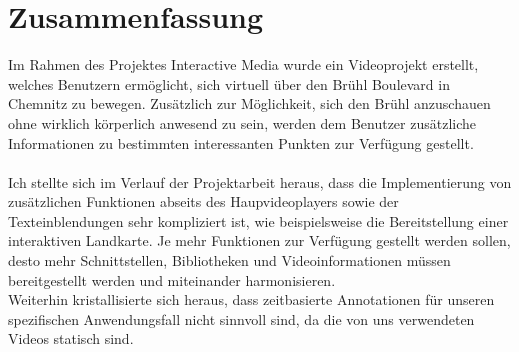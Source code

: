 \chapter{Zusammenfassung}
Im Rahmen des Projektes \glqq Interactive Media\grqq{} wurde ein Videoprojekt erstellt, welches Benutzern ermöglicht, sich virtuell über den Brühl Boulevard in Chemnitz zu bewegen. Zusätzlich zur Möglichkeit, sich den Brühl anzuschauen ohne wirklich körperlich anwesend zu sein, werden dem Benutzer zusätzliche Informationen zu bestimmten interessanten Punkten zur Verfügung gestellt.\\ \\
Ich stellte sich im Verlauf der Projektarbeit heraus, dass die Implementierung von zusätzlichen Funktionen abseits des Haupvideoplayers sowie der Texteinblendungen sehr kompliziert ist, wie beispielsweise die Bereitstellung einer interaktiven Landkarte. Je mehr Funktionen zur Verfügung gestellt werden sollen, desto mehr Schnittstellen, Bibliotheken und Videoinformationen müssen bereitgestellt werden und miteinander harmonisieren. \\
Weiterhin kristallisierte sich heraus, dass zeitbasierte Annotationen für unseren spezifischen Anwendungsfall nicht sinnvoll sind, da die von uns verwendeten Videos statisch sind.